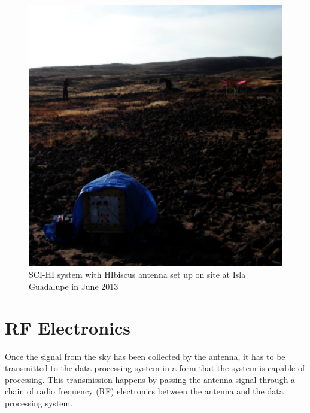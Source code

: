 
\begin{figure}[htb]
\begin{center}
\includegraphics[width=0.85\linewidth]{SCIHI_system/figures/SCIHI_guad_sys.jpg}
\caption{SCI-HI system with HIbiscus antenna set up on site at Isla Guadalupe in June 2013}
\label{Fig:sys_guad}

\end{center}
\end{figure}



\section{RF Electronics}

Once the signal from the sky has been collected by the antenna, it has to be transmitted to the data processing system in a form that the system is capable of processing.  This transmission happens by passing the antenna signal through a chain of radio frequency (RF) electronics between the antenna and the data processing system. 


